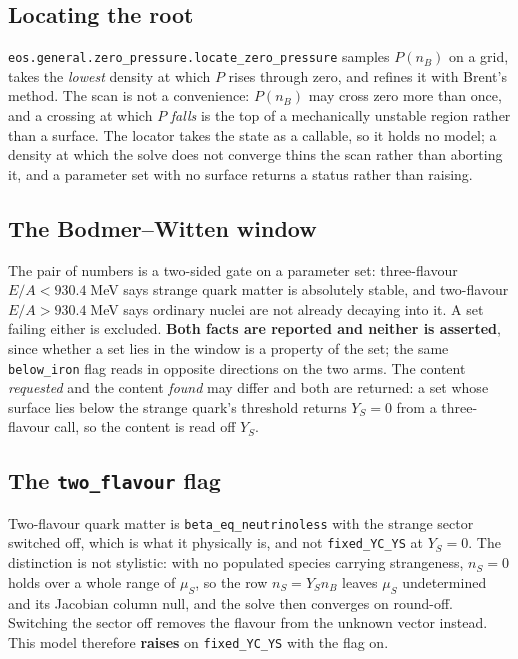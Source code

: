 \documentclass[aps,prc,onecolumn,superscriptaddress,nofootinbib,10pt]{revtex4-2}
\begin{document}
\subsection{Locating the root}

\texttt{eos.general.zero\_pressure.locate\_zero\_pressure} samples $P(n_B)$ on
a grid, takes the \emph{lowest} density at which $P$ rises through zero, and
refines it with Brent's method. The scan is not a convenience: $P(n_B)$ may
cross zero more than once, and a crossing at which $P$ \emph{falls} is the top
of a mechanically unstable region rather than a surface. The locator takes the
state as a callable, so it holds no model; a density at which the solve does
not converge thins the scan rather than aborting it, and a parameter set with
no surface returns a status rather than raising.

\subsection{The Bodmer--Witten window}

The pair of numbers is a two-sided gate on a parameter set: three-flavour
$E/A < 930.4\;$MeV says strange quark matter is absolutely stable, and
two-flavour $E/A > 930.4\;$MeV says ordinary nuclei are not already decaying
into it. A set failing either is excluded. \textbf{Both facts are reported and
neither is asserted}, since whether a set lies in the window is a property of
the set; the same \texttt{below\_iron} flag reads in opposite directions on the
two arms. The content \emph{requested} and the content \emph{found} may differ
and both are returned: a set whose surface lies below the strange quark's
threshold returns $Y_S = 0$ from a three-flavour call, so the content is read
off $Y_S$.

\subsection{The \texttt{two\_flavour} flag}

Two-flavour quark matter is \texttt{beta\_eq\_neutrinoless} with the strange
sector switched off, which is what it physically is, and not
\texttt{fixed\_YC\_YS} at $Y_S = 0$. The distinction is not stylistic: with no
populated species carrying strangeness, $n_S = 0$ holds over a whole range of
$\mu_S$, so the row $n_S = Y_S n_B$ leaves $\mu_S$ undetermined and its
Jacobian column null, and the solve then converges on round-off. Switching the
sector off removes the flavour from the unknown vector instead. This model
therefore \textbf{raises} on \texttt{fixed\_YC\_YS} with the flag on.
\end{document}
